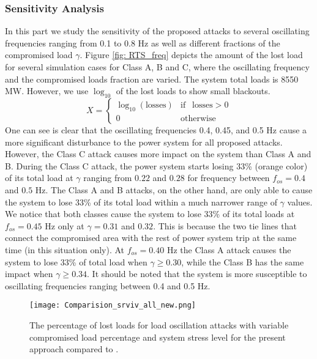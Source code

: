 \documentclass[journal]{IEEEtran}
\begin{document}
\subsubsection{Sensitivity Analysis}
In this part we  study  the  sensitivity  of  the proposed  attacks  to  several  oscillating  frequencies  ranging from 0.1 to 0.8 Hz as well as different fractions of the compromised load $\gamma$. Figure \ref{fig: RTS_freq} depicts the amount of the lost load for several simulation cases for Class A, B and C, where the oscillating frequency and the compromised loads fraction are varied. The system total loads is 8550 MW. However, we use $\log_{10}$ of the lost loads to show small blackouts.
\begin{equation}
\label{log}
X = 
    \begin{cases}
      \log_{10} (\text{losses}) & \text{if} ~~ \text{ losses} > 0\\
      0 & \text{otherwise}
      
    \end{cases}
 \end{equation}
One can see is clear that the oscillating frequencies 0.4, 0.45, and 0.5 Hz cause a more significant disturbance to the power system for all proposed attacks. However, the Class C attack causes more impact on the system than Class A and B. During the Class C attack, the power system starts losing 33\% (orange color) of its total load at $\gamma$ ranging from $0.22$ and $0.28$  for frequency between $ f_{os} = 0.4$ and $0.5 $ Hz. 
The Class A and B attacks, on the other hand, are only able to cause the system to lose 33\% of its total load within a much narrower range of $\gamma$ values. We notice that both classes cause the system to lose 33\% of its total loads at $f_{os}=0.45$ Hz only at $\gamma=0.31$ and $0.32$. This is because the two tie lines that connect the compromised area with the rest of power system trip at the same time (in this situation only). At $f_{os}=0.40$ Hz the Class A attack causes the system to lose 33\% of total load when $\gamma\geq0.30$, while the Class B has the same impact when $\gamma\geq0.34$. It should be noted that the system is more susceptible to oscillating frequencies ranging between 0.4 and 0.5 Hz.






\begin{figure}[t]
\texttt{[image: Comparision\_srviv\_all\_new.png]}
\caption{The percentage of lost loads for load oscillation attacks with variable compromised load percentage and system stress level for the present approach compared to \cite{carter, Anu}.}
\label{fig: comp_all}
\end{figure} 
\end{document}
